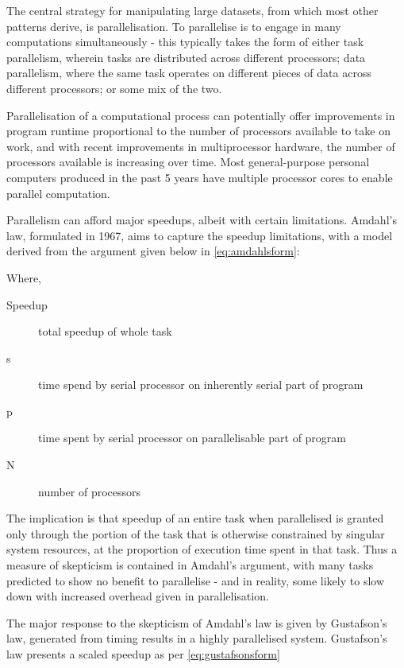
The central strategy for manipulating large datasets, from which most other patterns derive, is parallelisation.
To parallelise is to engage in many computations simultaneously - this typically takes the form of either task parallelism, wherein tasks are distributed across different processors; data parallelism, where the same task operates on different pieces of data across different processors; or some mix of the two.

Parallelisation of a computational process can potentially offer improvements in program runtime proportional to the number of processors available to take on work, and with recent improvements in multiprocessor hardware, the number of processors available is increasing over time.
Most general-purpose personal computers produced in the past 5 years have multiple processor cores to enable parallel computation.

Parallelism can afford major speedups, albeit with certain limitations.
Amdahl's law, formulated in 1967, aims to capture the speedup limitations, with a model derived from the argument given below in \cref{eq:amdahlsform}\cites{amdahl1967law,gustafson1988law}:


Where,

\begin{description} \item[Speedup] total speedup of whole task \item[s] time spend by serial processor on inherently serial part of program \item[p] time spent by serial processor on parallelisable part of program \item[N] number of processors \end{description}

The implication is that speedup of an entire task when parallelised is granted only through the portion of the task that is otherwise constrained by singular system resources, at the proportion of execution time spent in that task.
Thus a measure of skepticism is contained in Amdahl's argument, with many tasks predicted to show no benefit to parallelise - and in reality, some likely to slow down with increased overhead given in parallelisation.

The major response to the skepticism of Amdahl's law is given by Gustafson's law, generated from timing results in a highly parallelised system.
Gustafson's law presents a scaled speedup as per \cref{eq:gustafsonsform}

